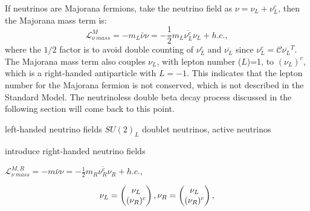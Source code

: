 If neutrinos are Majorana fermions, take the neutrino field as $\nu=\nu_L+\nu_L^c$, then the Majorana mass term is:  
\begin{equation}\label{major_mass}
\mathcal{L}^{M}_{\nu~mass} = -m_L\bar{\nu}\nu=-\frac{1}{2}m_L\overline{\nu_L^c}\nu_L+h.c.,
\end{equation}
where the $1/2$ factor is to avoid double counting of $\nu_L^c$ and $\overline{\nu_L}$ since $\nu_L^c=\mathcal{C}\overline{\nu_L}^T$\cite{giunti2007fundamentals}. The Majorana mass term also couples $\nu_L$, with lepton number ($L$)=1, to $(\nu_L)^c$, which is a right-handed antiparticle with $L=-1$. This indicates that the lepton number for the Majorana fermion is not conserved, which is not described in the Standard Model. The neutrinoless double beta decay process discussed in the following section will come back to this point.


left-handed neutrino fields $SU(2)_L$
doublet neutrinos, active neutrinos



introduce right-handed neutrino fields 

$\mathcal{L}^{M,R}_{\nu~mass} = -m\bar{\nu}\nu=-\frac{1}{2}m_R\overline{\nu_R^c}\nu_R+h.c.$,

\begin{equation}
\nu_L=
\begin{pmatrix}
\nu_L\\
(\nu_R)^c\\
\end{pmatrix},\\
\nu_R=
\begin{pmatrix}
\nu_L\\
(\nu_R)^c\\
\end{pmatrix},
\end{equation}

